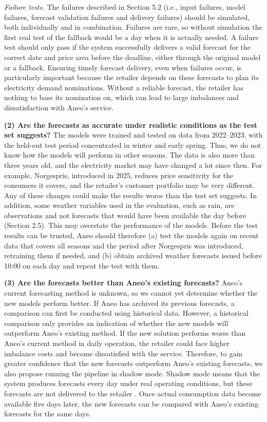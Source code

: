 \documentclass[11pt,a4paper]{article}
\begin{document}
\textit{Failure tests. }The failures described in Section 5.2 (i.e., input failures, model failures, forecast validation failures and delivery failures) should be simulated, both individually and in combination. Failures are rare, so without simulation the first real test of the fallback would be a day when it is actually needed. A failure test should only pass if the system successfully delivers a valid forecast for the correct date and price area before the deadline, either through the original model or a fallback. Ensuring timely forecast delivery, even when failures occur, is particularly important because the retailer depends on these forecasts to plan its electricity demand nominations. Without a reliable forecast, the retailer has nothing to base its nomination on, which can lead to large imbalances and dissatisfaction with Aneo’s service.

\textbf{(2) Are the forecasts as accurate under realistic conditions as the test set suggests?} The models were trained and tested on data from 2022–2023, with the held-out test period concentrated in winter and early spring. Thus, we do not know how the models will perform in other seasons. The data is also more than three years old, and the electricity market may have changed a lot since then. For example, Norgespris, introduced in 2025, reduces price sensitivity for the consumers it covers, and the retailer’s customer portfolio may be very different. Any of these changes could make the results worse than the test set suggests. In addition, some weather variables used in the evaluation, such as rain, are observations and not forecasts that would have been available the day before (Section 2.5). This may overstate the performance of the models. Before the test results can be trusted, Aneo should therefore (a) test the models again on recent data that covers all seasons and the period after Norgespris was introduced, retraining them if needed, and (b) obtain archived weather forecasts issued before 10:00 on each day and repeat the test with them.

\textbf{(3) Are the forecasts better than Aneo’s existing forecasts?} Aneo’s current forecasting method is unknown, so we cannot yet determine whether the new models perform better. If Aneo has archived its previous forecasts, a comparison can first be conducted using historical data. However, a historical comparison only provides an indication of whether the new models will outperform Aneo’s existing method. If the new solution performs worse than Aneo's current method in daily operation, the retailer could face higher imbalance costs and become dissatisfied with the service. Therefore, to gain greater confidence that the new forecasts outperform Aneo's existing forecasts, we also propose running the pipeline in shadow mode. Shadow mode means that the system produces forecasts every day under real operating conditions, but these forecasts are not delivered to the retailer \cite{samiullah_shadow_mode}. Once actual consumption data become available five days later, the new forecasts can be compared with Aneo’s existing forecasts for the same days.
\end{document}
